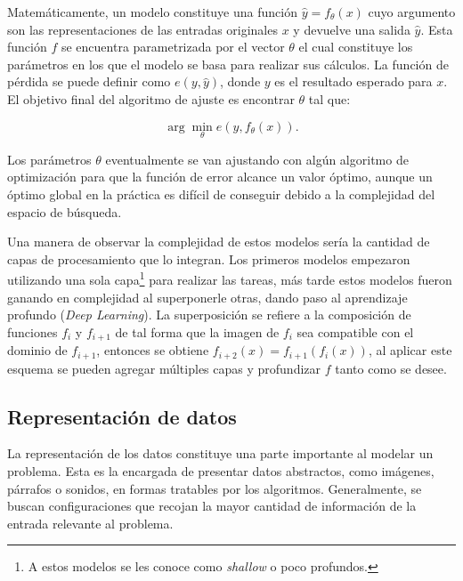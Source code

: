 \documentclass[a4paper,11pt,twocolumn,twoside]{article}
\begin{document}
Matemáticamente, un modelo constituye una función $\hat{y} = f_{\theta}(x)$ cuyo argumento son las 
representaciones de las entradas originales $x$ y devuelve una salida $\hat{y}$. Esta función $f$ se encuentra
parametrizada por el vector $\theta$ el cual constituye los parámetros en los que el modelo se basa para realizar sus
cálculos. La función de pérdida se puede definir como $e(y, \hat{y})$, donde $y$ es el resultado esperado para $x$. 
El objetivo final del algoritmo de ajuste es encontrar $\theta$ tal que:

\begin{equation}
	\arg \min_{\theta} e(y, f_{\theta}(x)).
	\label{eq:arg_min_theta}
\end{equation}

Los parámetros $\theta$ eventualmente se van ajustando con algún algoritmo de optimización para que 
la función de error alcance un valor óptimo, aunque un óptimo global en la práctica es difícil de conseguir
debido a la complejidad del espacio de búsqueda.

Una manera de observar la complejidad de estos modelos sería la cantidad de capas de procesamiento que lo integran.
Los primeros modelos empezaron utilizando una sola capa\footnote{A estos modelos se les conoce
	como \textit{shallow} o poco profundos.} para realizar 
las tareas, más tarde estos modelos fueron ganando en complejidad al superponerle otras, dando paso al 
aprendizaje profundo (\textit{Deep Learning}). La superposición se refiere
a la composición de funciones $f_i$ y $f_{i+1}$ de tal forma que la imagen de $f_i$ sea compatible con el dominio de 
$f_{i+1}$, entonces se obtiene $f_{i+2}(x) = f_{i+1}(f_i(x))$, al aplicar este esquema se pueden agregar múltiples
capas y profundizar $f$ tanto como se desee.


\subsection{Representación de datos}

La representación de los datos constituye una parte importante al modelar un problema. Esta 
es la encargada de presentar datos abstractos, como imágenes, párrafos o sonidos, en formas tratables
por los algoritmos. Generalmente, se buscan configuraciones que recojan la mayor cantidad de información 
de la entrada relevante al problema.
\end{document}
